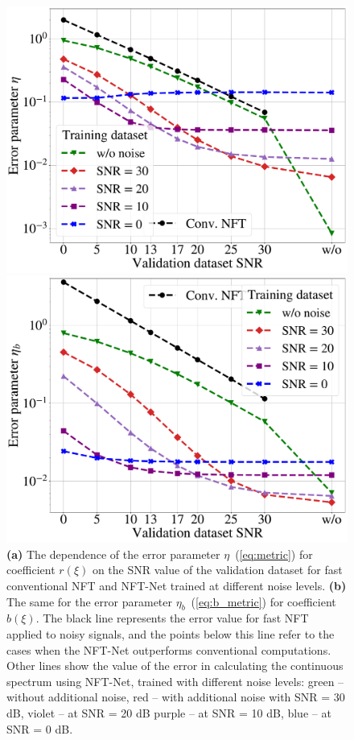 \begin{figure}[tp]
\centering
\begin{minipage}{.49\textwidth}
  \centering
  \includegraphics[width=1.\linewidth]{images/nn_nft/scirep_nft_r_metric.pdf}
  \caption{}
  \label{fig:quality_r}
\end{minipage}%
\begin{minipage}{.49\textwidth}
  \centering
  \includegraphics[width=1.\linewidth]{images/nn_nft/scirep_nft_b_metric.pdf}
  \caption{}
  \label{fig:quality_b}
\end{minipage}
\caption{\textbf{(a)} The dependence of the error parameter $\eta$~(\ref{eq:metric}) for coefficient $r(\xi)$ on the SNR value of the validation dataset for fast conventional NFT and NFT-Net trained at different noise levels. \textbf{(b)} The same for the error parameter $\eta_b$~(\ref{eq:b_metric}) for coefficient $b(\xi)$. The black line represents the error value for fast NFT applied to noisy signals, and the points below this line refer to the cases when the NFT-Net outperforms conventional computations. Other lines show  the value of the error in calculating the continuous spectrum using NFT-Net, trained with different noise levels: green -- without additional noise, red -- with additional noise with SNR = 30 dB, violet -- at SNR = 20 dB purple -- at SNR = 10 dB, blue -- at SNR = 0 dB.}
\label{fig:quality_r_b}
\end{figure}